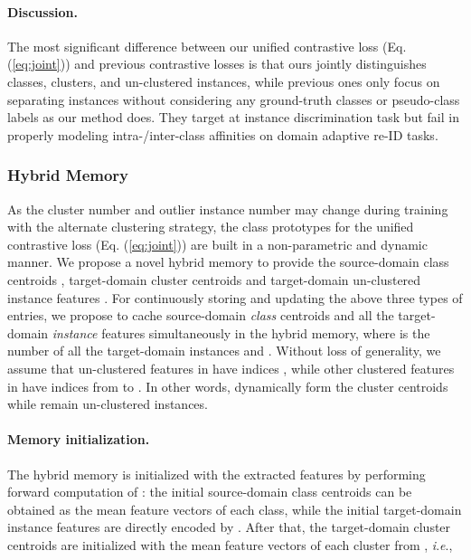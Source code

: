 \documentclass{article}
\newcommand{\ie}{\textit{i}.\textit{e}., }
\begin{document}
\vspace{-5pt}
\paragraph{Discussion.}
The most significant difference between our unified contrastive loss (Eq. (\ref{eq:joint})) and previous contrastive losses \cite{wu2018unsupervised,he2019momentum,chen2020simple,oord2018representation} is that ours jointly distinguishes classes, clusters, and un-clustered instances, while previous ones only focus on separating instances without considering any ground-truth classes or pseudo-class labels as our method does. 
They target at instance discrimination task but fail in properly modeling intra-/inter-class affinities on domain adaptive re-ID tasks.


\subsubsection{Hybrid Memory} 
\vspace{-5pt}

As the cluster number  and outlier instance number  may change during training with the alternate clustering strategy, the class prototypes for the unified contrastive loss (Eq. (\ref{eq:joint})) are built in a non-parametric and dynamic manner. 
We propose a novel hybrid memory to provide
the source-domain class centroids , target-domain cluster centroids  and target-domain un-clustered instance features 
.
For continuously storing and updating the above three types of entries,
we propose to cache source-domain \textit{class} centroids  and all the target-domain \textit{instance} features  simultaneously in the hybrid memory,
where  is the number of all the target-domain instances and .
Without loss of generality, we assume that un-clustered features in  have indices , while other clustered features in  have indices from  to .
In other words,  dynamically form the cluster centroids  while  remain un-clustered instances.




\vspace{-5pt}
\paragraph{Memory initialization.} 
The hybrid memory is initialized with the extracted features 
by performing forward computation of :
the initial source-domain class centroids  can be obtained as the mean feature vectors of each class, while the initial target-domain instance features  are directly encoded by . 
After that, the target-domain cluster centroids  are initialized with the mean feature vectors of each cluster from , \ie
\vspace{-5pt}
\end{document}

